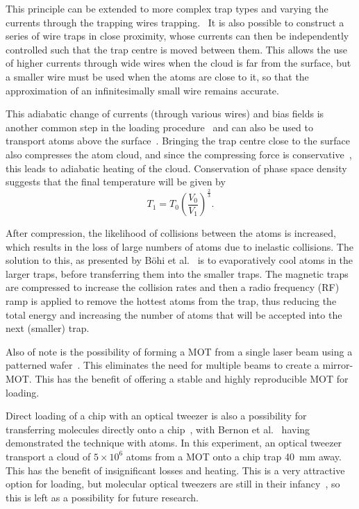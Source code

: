 This principle can be extended to more complex trap types and varying the
currents through the trapping wires trapping.~\cite{Folman2000} It is also
possible to construct a series of wire traps in close proximity, whose currents
can then be independently controlled such that the trap centre is moved between
them. This allows the use of higher currents through wide wires when the cloud
is far from the surface, but a smaller wire must be used when the atoms are
close to it, so that the approximation of an infinitesimally small wire remains
accurate.

This adiabatic change of currents (through various wires) and bias fields is
another common step in the loading procedure~\cite{Folman2000,2011Ac,
RevModPhys.79.235} and can also be used to transport atoms above the
surface~\cite{Reichel1999, Schwindt2005}. Bringing the trap centre close to the
surface also compresses the atom cloud, and since the compressing force is
conservative~\cite{Metcalf1999}, this leads to adiabatic heating of the cloud.
Conservation of phase space density suggests that the final temperature will be
given by~\cite{Metcalf1999}
%
\begin{equation}
   T_1 = T_0\left(\frac{V_0}{V_1}\right)^\frac{2}{3}.
\end{equation}

After compression, the likelihood of collisions between the atoms is increased,
which results in the loss of large numbers of atoms due to inelastic collisions.
The solution to this, as presented by B\"ohi et al.~\cite{Boehi2009} is to
evaporatively cool atoms in the larger traps, before transferring them into the
smaller traps. The magnetic traps are compressed to increase the collision
rates and then a radio frequency (RF) ramp is applied to remove the hottest
atoms from the trap, thus reducing the total energy and increasing the number of
atoms that will be accepted into the next (smaller) trap.~\cite{Foot2005,
Metcalf1999}

Also of note is the possibility of forming a MOT from a single laser beam using
a patterned wafer~\cite{Nshii2013}. This eliminates the need for multiple beams
to create a mirror-MOT. This has the benefit of offering a stable and highly
reproducible MOT for loading.

Direct loading of a chip with an optical tweezer is also a possibility for
transferring molecules directly onto a chip~\cite{Liueaar7797}, with Bernon et
al.~\cite{Bernon2013} having demonstrated the technique with atoms. In this
experiment, an optical tweezer transport a cloud of $5\times10^6$ \esRb
atoms from a MOT onto a chip trap \SI{40}{\milli\metre} away. This has the
benefit of insignificant losses and heating. This is a very attractive option
for loading, but molecular optical tweezers are still in their
infancy~\cite{Anderegg2019}, so this is left as a possibility for future
research.

